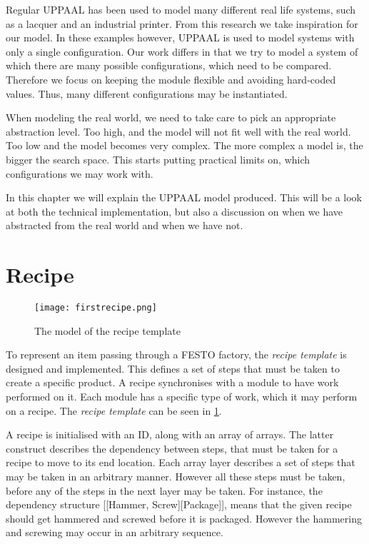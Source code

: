 Regular UPPAAL has been used to model many different real life systems, such as a lacquer\cite{so54514} and an industrial printer\cite{Igna2008}. From this research we take inspiration for our model. In these examples however, UPPAAL is used to model systems with only a single configuration. Our work differs in that we try to model a system of which there are many possible configurations, which need to be compared. Therefore we focus on keeping the module flexible and avoiding hard-coded values. Thus, many different configurations may be instantiated.

When modeling the real world, we need to take care to pick an appropriate abstraction level. Too high, and the model will not fit well with the real world. Too low and the model becomes very complex. The more complex a model is, the bigger the search space. This starts putting practical limits on, which configurations we may work with.

In this chapter we will explain the UPPAAL model produced. This will be a look at both the technical implementation, but also a discussion on when we have abstracted from the real world and when we have not.  

\section{Recipe}
\label{subs:recipe}

\begin{figure}[h]
\centering
\texttt{[image: firstrecipe.png]}
\caption{The model of the recipe template}
\label{fig:firstrecipe}
\end{figure}

To represent an item passing through a FESTO factory, the \emph{recipe template} is designed and implemented. This defines a set of steps that must be taken to create a specific product. A recipe synchronises with a module to have work performed on it. Each module has a specific type of work, which it may perform on a recipe. The \emph{recipe template} can be seen in \cref{fig:firstrecipe}.


A recipe is initialised with an ID, along with an array of arrays. The latter construct describes the dependency between steps, that must be taken for a recipe to move to its end location. Each array layer describes a set of steps that may be taken in an arbitrary manner. However all these steps must be taken, before any of the steps in the next layer may be taken. For instance, the dependency structure [[Hammer, Screw][Package]], means that the given recipe should get hammered and screwed before it is packaged. However the hammering and screwing may occur in an arbitrary sequence.



